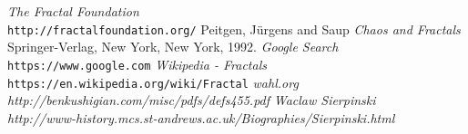 \documentclass[11pt,oneside,final]{article}
\begin{document}
\begin{thebibliography}{9}
	\textit{The Fractal Foundation}
	\\\texttt{http://fractalfoundation.org/}
	Peitgen, J\"urgens and Saup
	\textit{Chaos and Fractals}
	Springer-Verlag, New York, New York, 1992.
	\textit{Google Search}
	\\\texttt{https://www.google.com}
	\textit{Wikipedia - Fractals}
	\\\texttt{https://en.wikipedia.org/wiki/Fractal}
	\textit{wahl.org}
	\\\textit{http://benkushigian.com/misc/pdfs/defs455.pdf}
	\textit{Waclaw Sierpinski}
	\\\textit{http://www-history.mcs.st-andrews.ac.uk/Biographies/Sierpinski.html}
\end{thebibliography}
\end{document}
